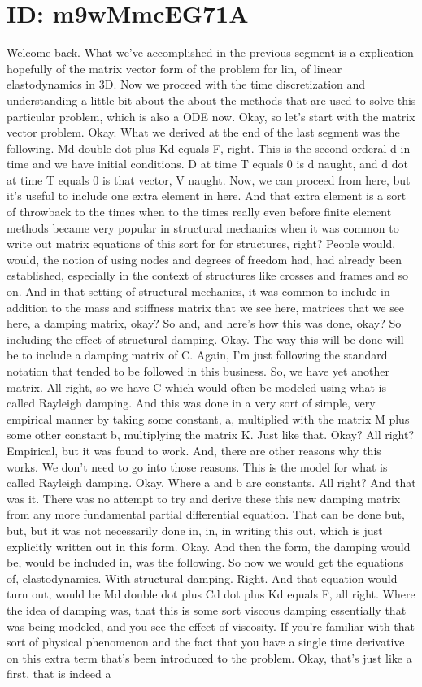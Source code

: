 \documentclass[10pt]{article}
\begin{document}
\section*{ID: m9wMmcEG71A}
Welcome back. What we've accomplished in the previous segment is a explication hopefully of the matrix vector form of the problem for lin, of linear elastodynamics in 3D. Now we proceed with the time discretization and understanding a little bit about the about the methods that are used to solve this particular problem, which is also a ODE now. Okay, so let's start with the matrix vector problem. Okay. What we derived at the end of the last segment was the following. Md double dot plus Kd equals F, right. This is the second orderal d in time and we have initial conditions. D at time T equals 0 is d naught, and d dot at time T equals 0 is that vector, V naught. Now, we can proceed from here, but it's useful to include one extra element in here. And that extra element is a sort of throwback to the times when to the times really even before finite element methods became very popular in structural mechanics when it was common to write out matrix equations of this sort for for structures, right? People would, would, the notion of using nodes and degrees of freedom had, had already been established, especially in the context of structures like crosses and frames and so on. And in that setting of structural mechanics, it was common to include in addition to the mass and stiffness matrix that we see here, matrices that we see here, a damping matrix, okay? So and, and here's how this was done, okay? So including the effect of structural damping. Okay. The way this will be done will be to include a damping matrix of C. Again, I'm just following the standard notation that tended to be followed in this business. So, we have yet another matrix. All right, so we have C which would often be modeled using what is called Rayleigh damping. And this was done in a very sort of simple, very empirical manner by taking some constant, a, multiplied with the matrix M plus some other constant b, multiplying the matrix K. Just like that. Okay? All right? Empirical, but it was found to work. And, there are other reasons why this works. We don't need to go into those reasons. This is the model for what is called Rayleigh damping. Okay. Where a and b are constants. All right? And that was it. There was no attempt to try and derive these this new damping matrix from any more fundamental partial differential equation. That can be done but, but, but it was not necessarily done in, in, in writing this out, which is just explicitly written out in this form. Okay. And then the form, the damping would be, would be included in, was the following. So now we would get the equations of, elastodynamics. With structural damping. Right. And that equation would turn out, would be Md double dot plus Cd dot plus Kd equals F, all right. Where the idea of damping was, that this is some sort viscous damping essentially that was being modeled, and you see the effect of viscosity. If you're familiar with that sort of physical phenomenon and the fact that you have a single time derivative on this extra term that's been introduced to the problem. Okay, that's just like a first, that is indeed a 
\end{document}
